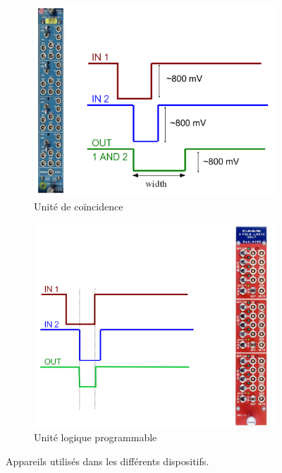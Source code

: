 \begin{figure}[p]
	\vspace{1cm}    
    \begin{subfigure}[t]{0.45\textwidth}
        \includegraphics[height=0.3\textheight, width=\textwidth, keepaspectratio]{figures/UniteDeCoincidence_crop.png}
        \caption{Unit{\'e} de co{\"i}ncidence}
        \label{fig:coincidence}
    \end{subfigure}
    \hfill
    \begin{subfigure}[t]{0.45\textwidth}
        \includegraphics[height=0.3\textheight, width=\textwidth, keepaspectratio]{figures/UniteLogiqueProgrammable.png}
        \caption{Unit{\'e} logique programmable}
        \label{fig:programmable}
    \end{subfigure}
    \caption{Appareils utilis{\'e}s dans les différents dispositifs.}
    \label{fig:devices}
\end{figure}
